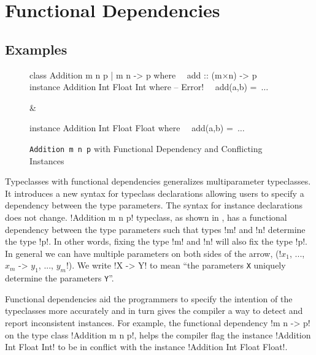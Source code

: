 \documentclass[format=acmsmall,manuscript,screen,nonacm,margin=1in,11pt]{acmart}
\begin{document}
\section{Functional Dependencies}
\subsection{Examples}\label{subsec:fd}
\begin{figure}[ht]
  \footnotesize
  \begin{tabularx}\textwidth{X X}
\begin{code}^^J
class Addition m n p | m n -> p where^^J
\ \  add :: (m$\times$n) -> p^^J
^^J
instance Addition Int Float Int where -- Error!^^J
\ \  add(a,b) =\ $\ldots$^^J
\end{code}&%
\begin{code}^^J
instance Addition Int Float Float where^^J
\ \  add(a,b) =\ $\ldots$^^J
\end{code}
  \end{tabularx}
  \caption{\texttt{Addition m n p} with Functional Dependency and Conflicting Instances}
  \label{fig:add-tc-fd}
\end{figure}

Typeclasses with functional dependencies\cite{jones_tcfd_2000} generalizes
multiparameter typeclasses. It introduces a new syntax for typeclass declarations
allowing users to specify a dependency between the type parameters.
The syntax for instance declarations does not change. !Addition m n p! typeclass,
as shown in , has a functional dependency
between the type parameters such that types !m! and !n! determine the type !p!.
In other words, fixing the type !m! and !n! will also fix the type !p!.
In general we can have multiple parameters on both sides of the arrow,
(!$x_1$, ..., $x_m$ -> $y_1$, ..., $y_m$!). We write !X -> Y! to mean
``the parameters \texttt{X} uniquely determine the parameters \texttt{Y}''.

Functional dependencies aid the programmers to specify the intention of the typeclasses
more accurately and in turn gives the compiler a way to detect and report inconsistent instances.
For example, the functional dependency !m n -> p! on the type class !Addition m n p!,
helps the compiler flag the instance !Addition Int Float Int! to be in conflict with the instance
!Addition Int Float Float!.
\end{document}

